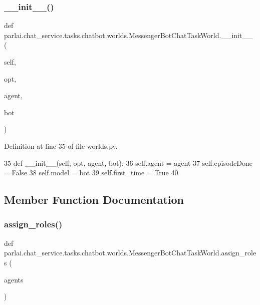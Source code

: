 \subsubsection{\texorpdfstring{\+\_\+\+\_\+init\+\_\+\+\_\+()}{\_\_init\_\_()}}
{\footnotesize\ttfamily def parlai.\+chat\+\_\+service.\+tasks.\+chatbot.\+worlds.\+Messenger\+Bot\+Chat\+Task\+World.\+\_\+\+\_\+init\+\_\+\+\_\+ (\begin{DoxyParamCaption}\item[{}]{self,  }\item[{}]{opt,  }\item[{}]{agent,  }\item[{}]{bot }\end{DoxyParamCaption})}



Definition at line 35 of file worlds.\+py.


\begin{DoxyCode}
35     \textcolor{keyword}{def }\_\_init\_\_(self, opt, agent, bot):
36         self.agent = agent
37         self.episodeDone = \textcolor{keyword}{False}
38         self.model = bot
39         self.first\_time = \textcolor{keyword}{True}
40 
\end{DoxyCode}


\subsection{Member Function Documentation}
\mbox{\label{classparlai_1_1chat__service_1_1tasks_1_1chatbot_1_1worlds_1_1MessengerBotChatTaskWorld_af00ebaa48c6d1125d3e1bc421940aa2f}} 
\subsubsection{\texorpdfstring{assign\+\_\+roles()}{assign\_roles()}}
{\footnotesize\ttfamily def parlai.\+chat\+\_\+service.\+tasks.\+chatbot.\+worlds.\+Messenger\+Bot\+Chat\+Task\+World.\+assign\+\_\+roles (\begin{DoxyParamCaption}\item[{}]{agents }\end{DoxyParamCaption})\hspace{0.3cm}{\ttfamily [static]}}



